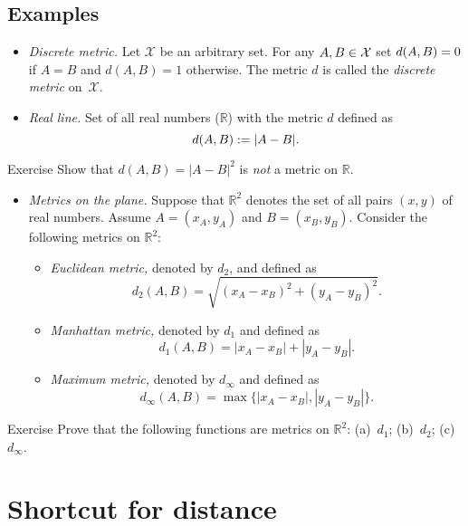 \pagebreak

\subsection*{Examples}

\begin{itemize}
\item {}\emph{Discrete metric.} Let $\mathcal X$ be an arbitrary set. 
For any $A,B\in\mathcal X$ set $d(A,B)=0$ if $A=B$ and $d(A,B)=1$ otherwise.
The metric $d$ is called the \emph{discrete metric} on~$\mathcal X$.
\item{}\emph{Real line.}
Set of all real numbers ($\mathbb{R}$) with the metric $d$ defined as 
$$d(A,B):=|A-B|.$$
\end{itemize}

\begin{thm}{Exercise}\label{ex:dist-square}
Show that $d(A,B)=|A-B|^2$ is \textit{not} a metric on $\mathbb{R}$.
\end{thm}

\begin{itemize}
\item \textit{Metrics on the plane.}
Suppose that $\mathbb{R}^2$ denotes the set of all pairs $(x,y)$ of real numbers.
Assume $A=(x_A,y_A)$ and $B=(x_B,y_B)$.
Consider the following metrics on $\mathbb{R}^2$:
\begin{itemize}
\item{}\emph{Euclidean metric,} denoted by $d_2$, and defined as \label{def:d_2}
$$d_2(A,B)=\sqrt{(x_A-x_B)^2+(y_A-y_B)^2}.$$
\item\label{Manhattan plane}\emph{Manhattan metric,} denoted by $d_1$ and defined as 
$$d_1(A,B)=|x_A-x_B|+|y_A-y_B|.$$
\item{}\emph{Maximum metric,} denoted by $d_\infty$ and defined as 
$$d_\infty(A,B)=\max\{|x_A-x_B|,|y_A-y_B|\}.$$
\end{itemize}
\end{itemize}

\begin{thm}{Exercise}\label{ex:d_1+d_2+d_infty}
Prove that the following functions are metrics on $\mathbb{R}^2$:
(a)~$d_1$; (b)~$d_2$; (c)~$d_\infty$.
\end{thm}


\section{Shortcut for distance}

